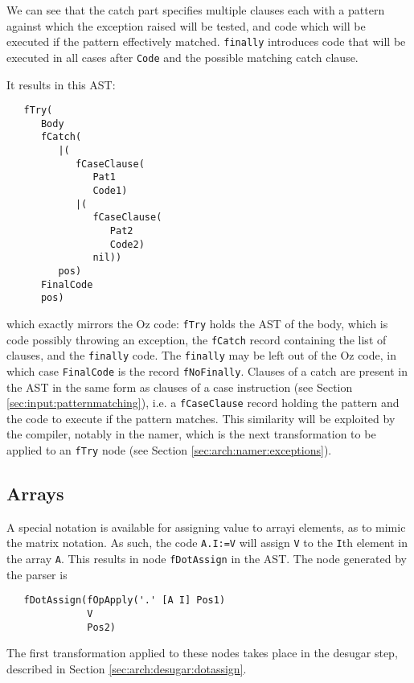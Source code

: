 \documentclass[a4paper]{memoir}
\begin{document}
We can see that the catch part specifies multiple clauses each with a pattern
against which the exception raised will be tested, and code which will be
executed if the pattern effectively matched. \lstinline!finally! introduces code
that will be executed in all cases after \lstinline!Code! and the possible
matching catch clause.

It results in this AST:
\begin{lstlisting}
   fTry(
      Body
      fCatch(
         |(
            fCaseClause(
               Pat1
               Code1)
            |(
               fCaseClause(
                  Pat2
                  Code2)
               nil))
         pos)
      FinalCode
      pos)
\end{lstlisting}

which exactly mirrors the Oz code: \lstinline!fTry! holds the AST of the body,
which is code possibly throwing an exception, the \lstinline!fCatch! record containing the list of
clauses, and the \lstinline!finally! code. The \lstinline!finally! may be left
out of the Oz code, in which case \lstinline!FinalCode! is the record
\lstinline!fNoFinally!.
Clauses of a catch are present in the AST in the same form as clauses of a case
instruction (see Section \ref{sec:input:patternmatching}), i.e. a
\lstinline!fCaseClause! record holding the pattern and the code to execute if
the pattern matches. This similarity will be exploited by the compiler, notably
in the namer, which is the next transformation to be applied to an
\lstinline!fTry! node (see Section \ref{sec:arch:namer:exceptions}).


\subsection{Arrays}
A special notation is available for assigning value to arrayi elements, as to mimic the
matrix notation. As such, the code \lstinline!A.I:=V! will assign \lstinline!V!
to the \lstinline!I!th element in the array \lstinline!A!.
This results in node \lstinline!fDotAssign! in the AST. The node generated by
the parser is
\begin{lstlisting}
   fDotAssign(fOpApply('.' [A I] Pos1) 
              V 
              Pos2) 
\end{lstlisting}
The first transformation applied to these nodes takes place in the desugar step,
described in Section \ref{sec:arch:desugar:dotassign}.
\end{document}
